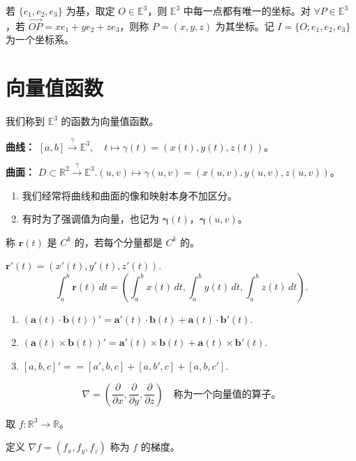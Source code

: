 \documentclass[lang=cn,10pt,thmcnt=section]{elegantbook}
\renewcommand{\vec}[1]{\mathbf{#1}}
\begin{document}
\begin{definition}[坐标系]
    若 $\{e_1, e_2, e_3\}$ 为基，取定 $O \in \mathbb{E}^3$，则 $\mathbb{E}^3$ 中每一点都有唯一的坐标。对 $\forall P \in \mathbb{E}^3$，若 $\overrightarrow{OP} = x e_1 + y e_2 + z e_3$，则称 $P = (x, y, z)$ 为其坐标。记 $I = \{O; e_1, e_2, e_3\}$ 为一个坐标系。
\end{definition}
\section{向量值函数}
我们称到 $\mathbb{E}^3$ 的函数为向量值函数。

\textbf{曲线：} $[a,b] \xrightarrow{\gamma} \mathbb{E}^3, \quad t \mapsto \gamma(t) = (x(t), y(t), z(t))$。

\textbf{曲面：} $D \subset \mathbb{R}^2 \xrightarrow{\gamma} \mathbb{E}^3$.$(u,v) \mapsto \gamma(u,v) = (x(u,v), y(u,v), z(u,v))$。

\begin{enumerate} 
    \item 我们经常将曲线和曲面的像和映射本身不加区分。
    \item 有时为了强调值为向量，也记为 $\vec{\gamma}(t)$，$\vec{\gamma}(u,v)$。
\end{enumerate}

称 $\vec{r}(t)$ 是 $C^k$ 的，若每个分量都是 $C^k$ 的。

\begin{definition}
    $\vec{r}'(t) = (x'(t), y'(t), z'(t))$.
    \[
    \int_a^b \vec{r}(t) \, dt = \left( \int_a^b x(t) \, dt, \int_a^b y(t) \, dt, \int_a^b z(t) \, dt \right).
    \]
\end{definition}

\begin{proposition}[Leibniz法则]
    \begin{enumerate}
        \item $\left( \vec{a}(t) \cdot \vec{b}(t) \right)' = \vec{a}'(t) \cdot \vec{b}(t) + \vec{a}(t) \cdot \vec{b}'(t)$.
        \item $\left( \vec{a}(t) \times \vec{b}(t) \right)' = \vec{a}'(t) \times \vec{b}(t) + \vec{a}(t) \times \vec{b}'(t)$.
        \item $[a, b, c]'== [a', b, c] + [a, b', c] + [a, b, c'].$
    \end{enumerate}
\end{proposition}

\begin{definition}[nabla算子]
    \[
\nabla = \left( \frac{\partial}{\partial x}, \frac{\partial}{\partial y}, \frac{\partial}{\partial z} \right) \quad \text{称为一个向量值的算子。}
\]
\end{definition}
取 $f: \mathbb{R}^3 \rightarrow \mathbb{R}$。
\begin{definition}[梯度]
    定义 $\nabla f = (f_x, f_y, f_z)$ 称为 $f$ 的梯度。
    \end{definition}
    
\end{document}
